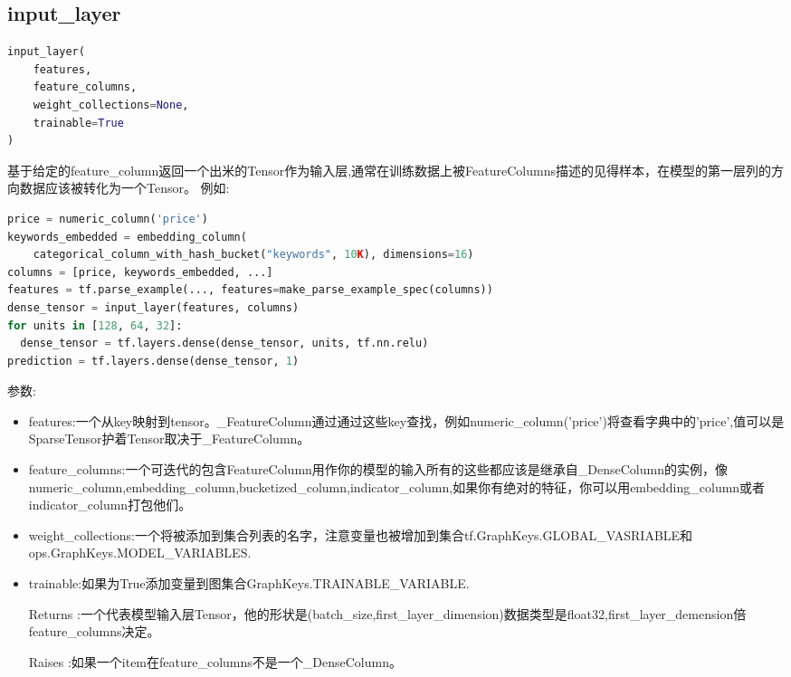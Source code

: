 \subsection{input\_layer}
\begin{lstlisting}[language=Python]
input_layer(
    features,
    feature_columns,
    weight_collections=None,
    trainable=True
)
\end{lstlisting}
基于给定的feature\_column返回一个出米的Tensor作为输入层,通常在训练数据上被FeatureColumns描述的见得样本，在模型的第一层列的方向数据应该被转化为一个Tensor。
例如:
\begin{lstlisting}[language=Python]
price = numeric_column('price')
keywords_embedded = embedding_column(
    categorical_column_with_hash_bucket("keywords", 10K), dimensions=16)
columns = [price, keywords_embedded, ...]
features = tf.parse_example(..., features=make_parse_example_spec(columns))
dense_tensor = input_layer(features, columns)
for units in [128, 64, 32]:
  dense_tensor = tf.layers.dense(dense_tensor, units, tf.nn.relu)
prediction = tf.layers.dense(dense_tensor, 1)
\end{lstlisting}
参数:
\begin{itemize}
	\item features:一个从key映射到tensor。\_FeatureColumn通过通过这些key查找，例如numeric\_column('price')将查看字典中的'price',值可以是SparseTensor护着Tensor取决于\_FeatureColumn。
	\item feature\_columns:一个可迭代的包含FeatureColumn用作你的模型的输入所有的这些都应该是继承自\_DenseColumn的实例，像numeric\_column,embedding\_column,bucketized\_column,indicator\_column,如果你有绝对的特征，你可以用embedding\_column或者indicator\_column打包他们。
	\item weight\_collections:一个将被添加到集合列表的名字，注意变量也被增加到集合tf.GraphKeys.GLOBAL\_VASRIABLE和ops.GraphKeys.MODEL\_VARIABLES.
	\item trainable:如果为True添加变量到图集合GraphKeys.TRAINABLE\_VARIABLE.
	\item[Returns]:一个代表模型输入层Tensor，他的形状是(batch\_size,first\_layer\_dimension)数据类型是float32,first\_layer\_demension倍feature\_columns决定。
	\item[Raises]:如果一个item在feature\_columns不是一个\_DenseColumn。
\end{itemize}
